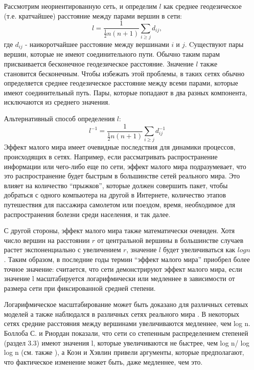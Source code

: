 \documentclass[a4paper]{article}
\begin{document}
Рассмотрим неориентированную сеть, и определим $l$ как среднее геодезическое (т.е. кратчайшее) расстояние между парами вершин в сети: $$ l = \frac{1}{\frac{1}{2}n(n+1)}\sum_{i \geq j}d_{ij},$$ где $d_{ij}$ - наикоротчайшее расстояние между вершинами $i$ и $j$.
Cуществуют пары вершин, которые не имеют соединительного пути. Обычно таким парам присваивается бесконечное геодезическое расстояние. Значение $l$ также становится бесконечным. Чтобы избежать этой проблемы, в таких сетях обычно определяется среднее геодезическое 
расстояние между всеми парами, которые имеют соединительный путь. Пары, которые попадают в два разных компонента, исключаются из среднего значения. 

Альтернативный способ определения $l$: $$l^{-1} = \frac{1}{\frac{1}{2}n(n+1)}\sum_{i \geq j}d_{ij}^{-1}$$
Эффект малого мира имеет очевидные последствия для динамики процессов, происходящих в сетях.
 Например, если рассматривать распространение информации или чего-либо еще по сети, эффект малого 
 мира подразумевает, что это распространение будет быстрым в большинстве сетей реального мира. 
  Это влияет на количество “прыжков”, которые должен совершить пакет, чтобы добраться с одного компьютера
  на другой в Интернете, количество этапов путешествия для пассажира самолетом или поездом, время,
   необходимое для распространения болезни среди населения, и так далее. 

С другой стороны, эффект малого мира также математически очевиден. Хотя число вершин на расстоянии $r$
от центральной вершины в большинстве случаев растет экспоненциально с увеличением $r$, значение $l$ будет увеличиваться как $logn$. Таким образом, в последние годы термин “эффект малого мира” приобрел 
более точное значение: считается, что сети демонстрируют эффект малого мира, если значение l 
   масштабируется логарифмически или медленнее в зависимости от размера сети при фиксированной средней 
   степени. 
   
 Логарифмическое масштабирование может быть доказано для различных сетевых моделей
     \cite{litlink7,litlink8,litlink9,litlink10,litlink11} а также наблюдался в различных сетях реального мира \cite{litlink12, litlink13, litlink14}. 
    В некоторых сетях средние расстояния между вершинами увеличиваются медленнее, чем log n. Боллоба С.
     и Риордан \cite{litlink15} показали, что сети со степенным распределением степеней (раздел 3.3) имеют значения
      l, которые увеличиваются не быстрее, чем log n/ log log n (см. также \cite{litlink16}), а Коэн и Хэвлин \cite{litlink17} 
      привели аргументы, которые предполагают, что фактическое изменение может быть, даже медленнее, 
      чем это.
\end{document}
